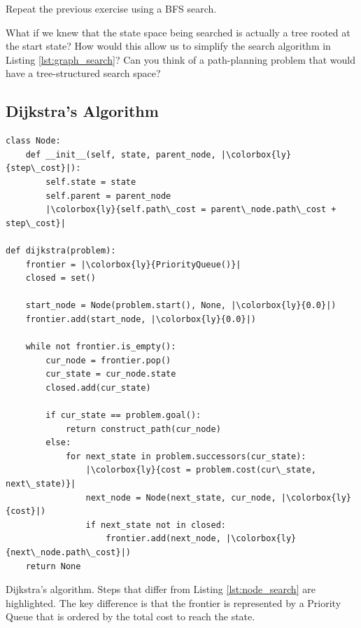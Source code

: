 \begin{exercise}
  Repeat the previous exercise using a BFS search.
\end{exercise}


\begin{exercise}
What if we knew that the state space being searched is actually a tree
rooted at the start state?  How would this allow us to simplify the
search algorithm in Listing \ref{lst:graph_search}?  Can you think of
a path-planning problem that would have a tree-structured search
space?
\end{exercise}

\subsection{Dijkstra's Algorithm}


\begin{listing}[H]
  \begin{verbatim}
class Node:
    def __init__(self, state, parent_node, |\colorbox{ly}{step\_cost}|):
        self.state = state
        self.parent = parent_node
        |\colorbox{ly}{self.path\_cost = parent\_node.path\_cost + step\_cost}|

def dijkstra(problem):
    frontier = |\colorbox{ly}{PriorityQueue()}|
    closed = set()

    start_node = Node(problem.start(), None, |\colorbox{ly}{0.0}|)
    frontier.add(start_node, |\colorbox{ly}{0.0}|)

    while not frontier.is_empty():
        cur_node = frontier.pop()
        cur_state = cur_node.state
        closed.add(cur_state)

        if cur_state == problem.goal():
            return construct_path(cur_node)
        else:
            for next_state in problem.successors(cur_state):
                |\colorbox{ly}{cost = problem.cost(cur\_state, next\_state)}|
                next_node = Node(next_state, cur_node, |\colorbox{ly}{cost}|)
                if next_state not in closed:
                    frontier.add(next_node, |\colorbox{ly}{next\_node.path\_cost}|)
    return None
\end{verbatim}
\caption{Dijkstra's algorithm.  Steps that differ from Listing
  \ref{lst:node_search} are highlighted.  The key difference is that
  the frontier is represented by a Priority Queue that is ordered by
  the total cost to reach the state.}
\label{lst:dijkstra}
\end{listing}


